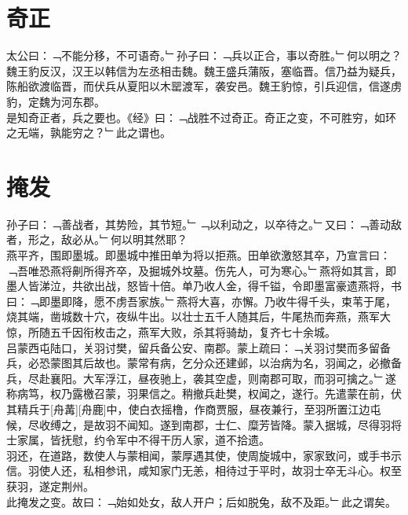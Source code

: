\chapter{奇正}%
太公曰：﹁不能分移，不可语奇。﹂孙子曰：﹁兵以正合，事以奇胜。﹂何以明之？\\
魏王豹反汉，汉王以韩信为左丞相击魏。魏王盛兵蒲阪，塞临晋。信乃益为疑兵，陈船欲渡临晋，而伏兵从夏阳以木罂渡军，袭安邑。魏王豹惊，引兵迎信，信遂虏豹，定魏为河东郡。\\
是知奇正者，兵之要也。《经》曰：﹁战胜不过奇正。奇正之变，不可胜穷，如环之无端，孰能穷之？﹂此之谓也。
%
%
\chapter{掩发}%
孙子曰：﹁善战者，其势险，其节短。﹂﹁以利动之，以卒待之。﹂又曰：﹁善动敌者，形之，敌必从。﹂何以明其然耶？\\
燕平齐，围即墨城。即墨城中推田单为将以拒燕。田单欲激怒其卒，乃宣言曰：﹁吾唯恐燕将劓所得齐卒，及掘城外坟墓。伤先人，可为寒心。﹂燕将如其言，即墨人皆涕泣，共欲出战，怒皆十倍。单乃收人金，得千镒，令即墨富豪遗燕将，书曰：﹁即墨即降，愿不虏吾家族。﹂燕将大喜，亦懈。乃收牛得千头，束苇于尾，烧其端，凿城数十穴，夜纵牛出。以壮士五千人随其后，牛尾热而奔燕，燕军大惊，所随五千因衔枚击之，燕军大败，杀其将骑劫，复齐七十余城。\\
吕蒙西屯陆口，关羽讨樊，留兵备公安、南郡。蒙上疏曰：﹁关羽讨樊而多留备兵，必恐蒙图其后故也。蒙常有病，乞分众还建邺，以治病为名，羽闻之，必撤备兵，尽赴襄阳。大军浮江，昼夜驰上，袭其空虚，则南郡可取，而羽可擒之。﹂遂称病笃，权乃露檄召蒙，羽果信之。稍撤兵赴樊，权闻之，遂行。先遣蒙在前，伏其精兵于[舟冓][舟鹿]中，使白衣摇橹，作商贾服，昼夜兼行，至羽所置江边屯候，尽收缚之，是故羽不闻知。遂到南郡，士仁、糜芳皆降。蒙入据城，尽得羽将士家属，皆抚慰，约令军中不得干历人家，道不拾遗。\\
羽还，在道路，数使人与蒙相闻，蒙厚遇其使，使周旋城中，家家致问，或手书示信。羽使人还，私相参讯，咸知家门无恙，相待过于平时，故羽士卒无斗心。权至获羽，遂定荆州。\\
此掩发之变。故曰：﹁始如处女，敌人开户；后如脱兔，敌不及距。﹂此之谓矣。
%
%
